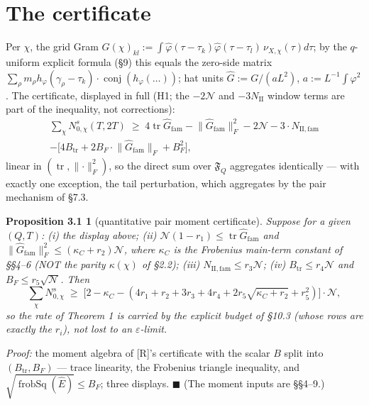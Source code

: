 \documentclass[11pt]{amsart}
\newcommand{\tr}{\operatorname{tr}}
\newcommand{\conj}{\operatorname{conj}}
\DeclareMathOperator{\frobSq}{frobSq}
\theoremstyle{plain}
\newtheorem*{propositionthreeone}{Proposition 3.1}
\theoremstyle{remark}
\begin{document}
\section{The certificate}

Per $\chi$, the grid Gram $G(\chi)_{kl} := \int \widehat{\varphi}(\tau - \tau_k)
\widehat{\varphi}(\tau - \tau_l)\, \nu_{X,\chi}(\tau)d\tau$; by the $q$-uniform
explicit formula (\S9) this equals the zero-side matrix
$\sum_\rho m_\rho h_\varphi(\gamma_\rho - \tau_k)\cdot\conj(h_\varphi(\dots))$; hat
units $\widehat{G} := G/(aL^2)$, $a := L^{-1}\int\varphi^2$. The certificate,
displayed in full (H1; the $-2\mathcal{N}$ and $-3N_{\mathrm{II}}$ window terms are
part of the inequality, not corrections):
\begin{multline*}
\sum_\chi N^{s}_{0,\chi}(T, 2T) \;\ge\; 4 \tr \widehat{G}_{\mathrm{fam}}
- \lVert\widehat{G}_{\mathrm{fam}}\rVert^2_F - 2\mathcal{N}
- 3\cdot N_{\mathrm{II,fam}} \\
- \bigl[4B_{\mathrm{tr}} + 2B_F\cdot\lVert\widehat{G}_{\mathrm{fam}}\rVert_F
+ B_F^2\bigr],
\end{multline*}
linear in $(\tr, \lVert\cdot\rVert^2_F)$, so the direct sum over $\mathfrak{F}_Q$
aggregates identically --- with exactly one exception, the tail perturbation, which
aggregates by the pair mechanism of \S7.3.

\begin{propositionthreeone}[quantitative pair moment certificate]
Suppose for a given $(Q, T)$: (i) the display above; (ii)
$\mathcal{N}(1 - r_1) \le \tr \widehat{G}_{\mathrm{fam}}$ and
$\lVert\widehat{G}_{\mathrm{fam}}\rVert^2_F \le (\kappa_C + r_2)\mathcal{N}$, where
$\kappa_C$ is the Frobenius main-term constant of \S\S4--6 (NOT the parity
$\kappa(\chi)$ of \S2.2); (iii) $N_{\mathrm{II,fam}} \le r_3\mathcal{N}$; (iv)
$B_{\mathrm{tr}} \le r_4\mathcal{N}$ and $B_F \le r_5\sqrt{\mathcal{N}}$. Then
\[
\sum_\chi N^{s}_{0,\chi} \;\ge\; \bigl[2 - \kappa_C - (4r_1 + r_2 + 3r_3 + 4r_4
+ 2r_5\sqrt{\kappa_C+r_2} + r_5^2)\bigr]\cdot\mathcal{N},
\]
so the rate of Theorem 1 is carried by the explicit budget of \S10.3 (whose rows are
exactly the $r_i$), not lost to an $\varepsilon$-limit.
\end{propositionthreeone}

\emph{Proof:} the moment algebra of [R]'s certificate with the scalar $B$ split into
$(B_{\mathrm{tr}}, B_F)$ --- trace linearity, the Frobenius triangle inequality, and
$\sqrt{\frobSq(\widehat{E})} \le B_F$; three displays. $\blacksquare$ (The moment
inputs are \S\S4--9.)
\end{document}
